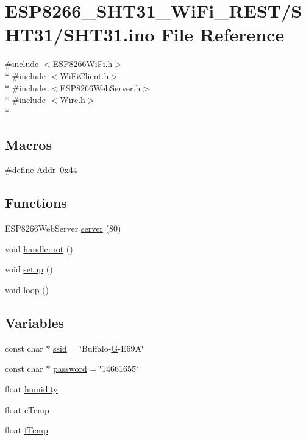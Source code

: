 \hypertarget{SHT31_8ino}{\section{E\-S\-P8266\-\_\-\-S\-H\-T31\-\_\-\-Wi\-Fi\-\_\-\-R\-E\-S\-T/\-S\-H\-T31/\-S\-H\-T31.ino File Reference}
\label{SHT31_8ino}
}
{\ttfamily \#include $<$E\-S\-P8266\-Wi\-Fi.\-h$>$}\\*
{\ttfamily \#include $<$Wi\-Fi\-Client.\-h$>$}\\*
{\ttfamily \#include $<$E\-S\-P8266\-Web\-Server.\-h$>$}\\*
{\ttfamily \#include $<$Wire.\-h$>$}\\*
\subsection*{Macros}
\begin{DoxyCompactItemize}
\item 
\#define \hyperlink{SHT31_8ino_a0faf74e4f4bc683411f373473b2e116e}{Addr}~0x44
\end{DoxyCompactItemize}
\subsection*{Functions}
\begin{DoxyCompactItemize}
\item 
E\-S\-P8266\-Web\-Server \hyperlink{SHT31_8ino_a58141c4f251beaa1fee89b632d87152f}{server} (80)
\item 
void \hyperlink{SHT31_8ino_ab9422a0a4b5f03797ea2b111d761e350}{handleroot} ()
\item 
void \hyperlink{SHT31_8ino_a4fc01d736fe50cf5b977f755b675f11d}{setup} ()
\item 
void \hyperlink{SHT31_8ino_afe461d27b9c48d5921c00d521181f12f}{loop} ()
\end{DoxyCompactItemize}
\subsection*{Variables}
\begin{DoxyCompactItemize}
\item 
const char $\ast$ \hyperlink{SHT31_8ino_a587ba0cb07f02913598610049a3bbb79}{ssid} = \char`\"{}Buffalo-\/\hyperlink{OWGeneric__SensorStation_8ino_a0b5841fe91d5a3db72753b6217923030}{G}-\/E69\-A\char`\"{}
\item 
const char $\ast$ \hyperlink{SHT31_8ino_aa4a2ebcb494493f648ae1e6975672575}{password} = \char`\"{}14661655\char`\"{}
\item 
float \hyperlink{SHT31_8ino_a6a87b2b0cff24d38b367ccd34843a206}{humidity}
\item 
float \hyperlink{SHT31_8ino_abe4ae137c385fdbc12834212495f4237}{c\-Temp}
\item 
float \hyperlink{SHT31_8ino_ad8bb0570b3edfc2567c23ee80ef66f6c}{f\-Temp}
\end{DoxyCompactItemize}


